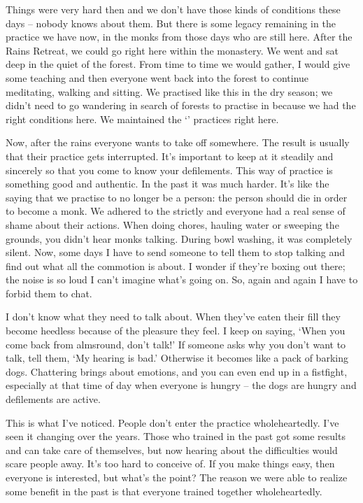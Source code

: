 Things were very hard then and we don't have those kinds of conditions these days -- nobody knows about them. But there is some legacy remaining in the practice we have now, in the monks from those days who are still here. After the Rains Retreat, we could go  right here within the monastery. We went and sat deep in the quiet of the forest. From time to time we would gather, I would give some teaching and then everyone went back into the forest to continue meditating, walking and sitting. We practised like this in the dry season; we didn't need to go wandering in search of forests to practise in because we had the right conditions here. We maintained the `' practices right here.

Now, after the rains everyone wants to take off somewhere. The result is usually that their practice gets interrupted. It's important to keep at it steadily and sincerely so that you come to know your defilements. This way of practice is something good and authentic. In the past it was much harder. It's like the saying that we practise to no longer be a person: the person should die in order to become a monk. We adhered to the  strictly and everyone had a real sense of shame about their actions. When doing chores, hauling water or sweeping the grounds, you didn't hear monks talking. During bowl washing, it was completely silent. Now, some days I have to send someone to tell them to stop talking and find out what all the commotion is about. I wonder if they're boxing out there; the noise is so loud I can't imagine what's going on. So, again and again I have to forbid them to chat.

I don't know what they need to talk about. When they've eaten their fill they become heedless because of the pleasure they feel. I keep on saying, `When you come back from almsround, don't talk!' If someone asks why you don't want to talk, tell them, `My hearing is bad.' Otherwise it becomes like a pack of barking dogs. Chattering brings about emotions, and you can even end up in a fistfight, especially at that time of day when everyone is hungry -- the dogs are hungry and defilements are active.

This is what I've noticed. People don't enter the practice wholeheartedly. I've seen it changing over the years. Those who trained in the past got some results and can take care of themselves, but now hearing about the difficulties would scare people away. It's too hard to conceive of. If you make things easy, then everyone is interested, but what's the point? The reason we were able to realize some benefit in the past is that everyone trained together wholeheartedly.


